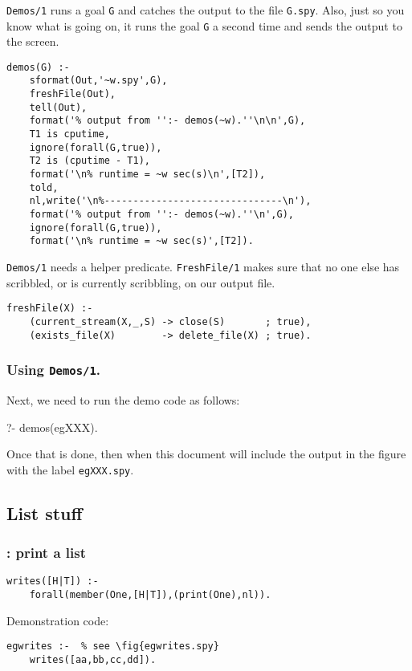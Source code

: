 \subsubsection{ 
}

{\tt Demos/1} runs a goal {\tt G} and catches the output to the file
{\tt G.spy}. Also, just so you know what is going on,
it runs the goal {\tt G} a second time and sends the output to the screen. 

\begin{Verbatim}
demos(G) :-
    sformat(Out,'~w.spy',G),
    freshFile(Out),
    tell(Out),
    format('% output from '':- demos(~w).''\n\n',G),
    T1 is cputime,
    ignore(forall(G,true)),
    T2 is (cputime - T1),
    format('\n% runtime = ~w sec(s)\n',[T2]),
    told,
    nl,write('\n%-------------------------------\n'),
    format('% output from '':- demos(~w).''\n',G),  
    ignore(forall(G,true)),
    format('\n% runtime = ~w sec(s)',[T2]).
\end{Verbatim}

{\tt Demos/1} needs a helper predicate. {\tt FreshFile/1} 
makes sure that no one
else has scribbled, or is currently scribbling, on our output file.

\begin{Verbatim}
freshFile(X) :- 
    (current_stream(X,_,S) -> close(S)       ; true),
    (exists_file(X)        -> delete_file(X) ; true).
\end{Verbatim}
\subsubsection{ Using {\tt Demos/1}.
}
 Next, we need to run the demo code as follows: 
\begin{LISTING}
?- demos(egXXX).
\end{LISTING}
Once that is done, then when this document will include the
output in the figure with the label {\tt egXXX.spy}.

\subsection{ List stuff
}
\subsubsection{ : print a list 
}
\label{sec:writes/1}
\begin{Verbatim}
writes([H|T]) :- 
    forall(member(One,[H|T]),(print(One),nl)).
\end{Verbatim}
 Demonstration code: 
\begin{Verbatim}
egwrites :-  % see \fig{egwrites.spy}
    writes([aa,bb,cc,dd]).
\end{Verbatim}
